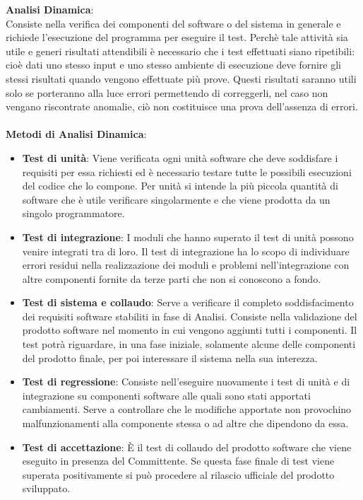 \textbf{Analisi Dinamica}:\medskip \\
Consiste nella verifica dei componenti del software o del sistema in generale e richiede l'esecuzione del programma per eseguire il test.
Perchè tale attività sia utile e generi risultati attendibili è necessario che i test effettuati siano ripetibili: cioè dati uno stesso input e uno stesso ambiente di esecuzione deve fornire gli stessi risultati quando vengono effettuate più prove. Questi risultati saranno utili solo se porteranno alla luce errori permettendo di correggerli, nel caso non vengano riscontrate anomalie, ciò non costituisce una prova dell'assenza di errori.
\\ \\ \textbf{Metodi di Analisi Dinamica}:
\begin{itemize}
	\item \textbf{Test di unità}:
	Viene verificata ogni unità software che deve soddisfare i requisiti per essa richiesti ed è necessario testare tutte le possibili esecuzioni del codice che lo compone. Per unità si intende la più piccola quantità di software che è utile verificare singolarmente e che viene prodotta da un singolo programmatore.
	\item \textbf{Test di integrazione}:
	I moduli che hanno superato il test di unità possono
	venire integrati tra di loro. Il test di integrazione ha lo scopo di individuare errori residui nella realizzazione dei moduli e problemi nell'integrazione con altre componenti fornite da terze parti che non si conoscono a fondo.
	\item \textbf{Test di sistema e collaudo}:
	Serve a verificare il completo soddisfacimento dei requisiti software stabiliti in fase di Analisi. Consiste nella validazione del prodotto software nel momento in cui vengono aggiunti tutti i componenti. Il test potrà riguardare, in una fase iniziale, solamente alcune delle componenti del prodotto finale, per poi interessare il sistema nella sua interezza.
	\item \textbf{Test di regressione}:
	Consiste nell'eseguire nuovamente i test di unità e di integrazione su componenti software alle quali sono stati apportati cambiamenti. Serve a  controllare che le modifiche apportate non provochino malfunzionamenti alla componente stessa o ad altre che dipendono da essa.
	\item \textbf{Test di accettazione}:
	È il test di collaudo del prodotto software che viene eseguito in presenza del Committente. Se questa fase finale di test viene superata positivamente si può procedere al rilascio ufficiale del prodotto sviluppato.
\end{itemize}
